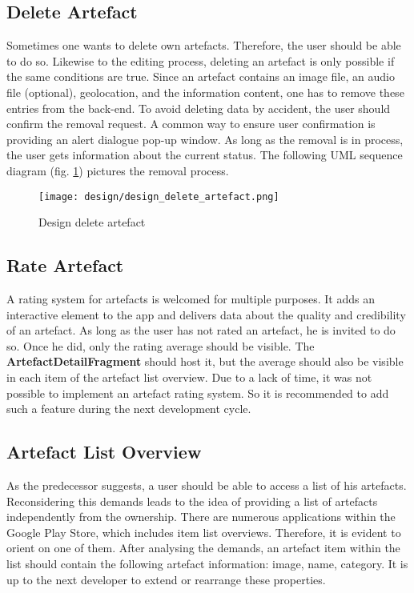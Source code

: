 \subsection{Delete Artefact}
Sometimes one wants to delete own artefacts. Therefore, the user should be able to do so. Likewise to the editing process, deleting an artefact is only possible if the same conditions are true. Since an artefact contains an image file, an audio file (optional), geolocation, and the information content, one has to remove these entries from the back-end. To avoid deleting data by accident, the user should confirm the removal request. A common way to ensure user confirmation is providing an alert dialogue pop-up window. As long as the removal is in process, the user gets information about the current status. The following UML sequence diagram (fig. \ref{fig:design_delete_artefact}) pictures the removal process. 

\begin{figure}[H]
    \centering \texttt{[image: design/design\_delete\_artefact.png]}
    \caption[Design delete artefact]{Design delete artefact}    
    \label{fig:design_delete_artefact}
\end{figure}


\subsection{Rate Artefact}
A rating system for artefacts is welcomed for multiple purposes. It adds an interactive element to the app and delivers data about the quality and credibility of an artefact. As long as the user has not rated an artefact, he is invited to do so. Once he did, only the rating average should be visible. The \textbf{ArtefactDetailFragment} should host it, but the average should also be visible in each item of the artefact list overview.
Due to a lack of time, it was not possible to implement an artefact rating system. So it is recommended to add such a feature during the next development cycle.

\subsection{Artefact List Overview}

As the predecessor suggests, a user should be able to access a list of his artefacts. Reconsidering this demands leads to the idea of providing a list of artefacts independently from the ownership. There are numerous applications within the Google Play Store, which includes item list overviews. Therefore, it is evident to orient on one of them. After analysing the demands, an artefact item within the list should contain the following artefact information: image, name, category. It is up to the next developer to extend or rearrange these properties.


